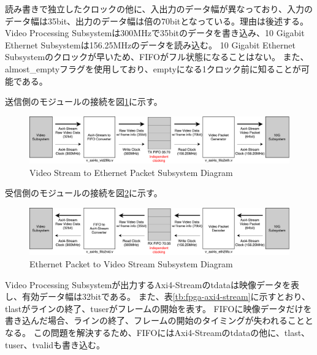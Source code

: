 \newpage
読み書きで独立したクロックの他に、入出力のデータ幅が異なっており、入力のデータ幅は35bit、出力のデータ幅は倍の70bitとなっている。理由は後述する。
Video Processing Subsystemは300MHzで35bitのデータを書き込み、10 Gigabit Ethernet Subsystemは156.25MHzのデータを読み込む。
10 Gigabit Ethernet Subsystemのクロックが早いため、FIFOがフル状態になることはない。
また、almost\_emptyフラグを使用しており、emptyになる1クロック前に知ることが可能である。

送信側のモジュールの接続を図\ref{fig:fpga-video-ethernet-diagram}に示す。

\begin{figure}[htbp]
  \begin{center}
    \includegraphics[bb=0 0 911 166,width=15.5cm]{img/fpga-video-ethernet-diagram.pdf}
  \end{center}
  \caption{Video Stream to Ethernet Packet Subsystem Diagram}
  \label{fig:fpga-video-ethernet-diagram}
\end{figure}

受信側のモジュールの接続を図\ref{fig:fpga-ethernet-video-diagram}に示す。

\begin{figure}[htbp]
  \begin{center}
    \includegraphics[bb=0 0 911 166,width=15.5cm]{img/fpga-ethernet-video-diagram.pdf}
  \end{center}
  \caption{Ethernet Packet to Video Stream Subsystem Diagram}
  \label{fig:fpga-ethernet-video-diagram}
\end{figure}

Video Processing Subsystemが出力するAxi4-Streamのtdataは映像データを表し、有効データ幅は32bitである。
また、表\ref{tb:fpga-axi4-stream}に示すとおり、tlastがラインの終了、tuserがフレームの開始を表す。
FIFOに映像データだけを書き込んだ場合、ラインの終了、フレームの開始のタイミングが失われることとなる。
この問題を解決するため、FIFOにはAxi4-Streamのtdataの他に、tlast、tuser、tvalidも書き込む。

